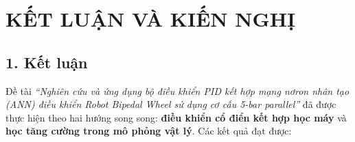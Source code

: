 
\chapter*{KẾT LUẬN VÀ KIẾN NGHỊ}
\label{chap:ketluan}


\section*{1. Kết luận}

Đề tài \textit{``Nghiên cứu và ứng dụng bộ điều khiển PID kết hợp mạng nơron
nhân tạo (ANN) điều khiển Robot Bipedal Wheel sử dụng cơ cấu 5-bar parallel''}
đã được thực hiện theo hai hướng song song: \textbf{điều khiển cổ điển kết hợp
học máy} và \textbf{học tăng cường trong mô phỏng vật lý}. Các kết quả đạt được:

